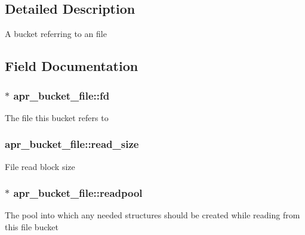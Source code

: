 \subsection{Detailed Description}
A bucket referring to an file 

\subsection{Field Documentation}
\subsubsection[{\texorpdfstring{fd}{fd}}]{$\ast$ apr\+\_\+bucket\+\_\+file\+::fd}\hypertarget{structapr__bucket__file_aa43154c0bc9d41ba4b0762c906de432f}{}\label{structapr__bucket__file_aa43154c0bc9d41ba4b0762c906de432f}
The file this bucket refers to 
\subsubsection[{\texorpdfstring{read\+\_\+size}{read_size}}]{ apr\+\_\+bucket\+\_\+file\+::read\+\_\+size}\hypertarget{structapr__bucket__file_a81c7e6646352fa03d4fb5a346dde4105}{}\label{structapr__bucket__file_a81c7e6646352fa03d4fb5a346dde4105}
File read block size 
\subsubsection[{\texorpdfstring{readpool}{readpool}}]{$\ast$ apr\+\_\+bucket\+\_\+file\+::readpool}\hypertarget{structapr__bucket__file_a61b5603482215f6c9ace7b26fa12b884}{}\label{structapr__bucket__file_a61b5603482215f6c9ace7b26fa12b884}
The pool into which any needed structures should be created while reading from this file bucket 

